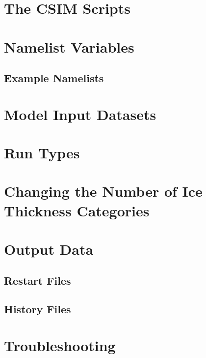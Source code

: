 \documentclass[]{article}
\begin{document}
\section{The CSIM Scripts}
    

    

\section{Namelist Variables}
  \label{namelist}
  
    \subsection{Example Namelists}
    

\section{Model Input Datasets}
  

\section{Run Types}
  \label{runtypes}
  

\section{Changing the Number of Ice Thickness Categories}
  \label{ncat}
  

\section{Output Data}
  
    \subsection{Restart Files}
      \label{restart_files}
      
    \subsection{History Files}
      \label{history_files}
      \label{history}
      

\section{Troubleshooting}
  

\newpage
 
\end{document}
